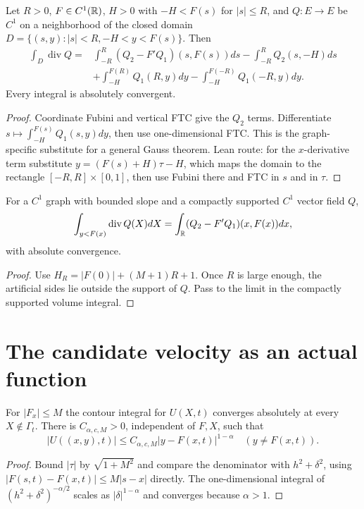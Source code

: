 \begin{lemma}
  \label{lem:c13_finite_graph_flux}
  Let $R>0$, $F\in C^1(\mathbb{R})$, $H>0$ with $-H<F(s)$ for $|s|\le R$, and
  $Q:E\to E$ be $C^1$ on a neighborhood of the closed domain
  $D=\{(s,y):|s|<R,-H<y<F(s)\}$. Then
  \[
  \begin{split}
    \int_D\operatorname{div}Q
      ={}&\int_{-R}^{R}(Q_2-F'Q_1)(s,F(s))ds-\int_{-R}^{R}Q_2(s,-H)ds\\
       &+\int_{-H}^{F(R)}Q_1(R,y)dy-\int_{-H}^{F(-R)}Q_1(-R,y)dy .
  \end{split}
  \]
  Every integral is absolutely convergent.
\end{lemma}
\begin{proof}
  Coordinate Fubini and vertical FTC give the $Q_2$ terms.
  Differentiate $s\mapsto\int_{-H}^{F(s)}Q_1(s,y)dy$, then use one-dimensional FTC.
  This is the graph-specific substitute for a general Gauss theorem.
  Lean route: for the $x$-derivative term substitute $y=(F(s)+H)\tau-H$, which maps the domain to the
  rectangle $[-R,R]\times[0,1]$, then use Fubini there and FTC in $s$ and in $\tau$.
\end{proof}

\begin{lemma}
  \label{lem:c13_compact_graph_flux}
  For a $C^1$ graph with bounded slope and a compactly supported $C^1$ vector field $Q$,
  \[
    \int_{y<F(x)}\operatorname{div}Q(X)dX
      =\int_{\mathbb{R}}(Q_2-F'Q_1)(x,F(x))dx,
  \]
  with absolute convergence.
\end{lemma}
\begin{proof}
  Use $H_R=|F(0)|+(M+1)R+1$. Once $R$ is large enough, the artificial sides lie outside
  the support of $Q$. Pass to the limit in the compactly supported volume integral.
\end{proof}

\section{The candidate velocity as an actual function}

\begin{lemma}
  \label{lem:c13_velocity_bound}
  For $|F_x|\le M$ the contour integral for $U(X,t)$ converges absolutely at every $X\notin\Gamma_t$.
  There is $C_{\alpha,c,M}>0$, independent of $F,X$, such that
  \[
    |U((x,y),t)|\le C_{\alpha,c,M}|y-F(x,t)|^{1-\alpha}\quad(y\ne F(x,t)).
  \]
\end{lemma}
\begin{proof}
  Bound $|\tau|$ by $\sqrt{1+M^2}$ and compare the denominator with
  $h^2+\delta^2$, using $|F(s,t)-F(x,t)|\le M|s-x|$ directly. The one-dimensional integral of $(h^2+\delta^2)^{-\alpha/2}$
  scales as $|\delta|^{1-\alpha}$ and converges because $\alpha>1$.
\end{proof}

